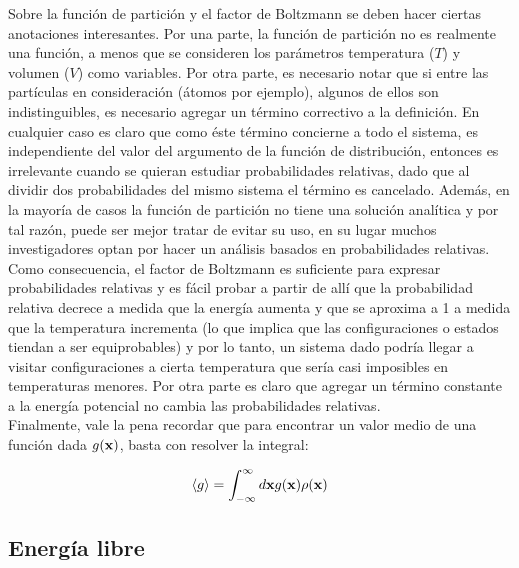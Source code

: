 \documentclass [11pt]{article}
\begin{document}
Sobre la función de partición y el factor de Boltzmann se deben hacer ciertas anotaciones interesantes. Por una parte, la función de partición no es realmente una función, a menos que se consideren los parámetros temperatura ($T$) y volumen ($V$) como variables. Por otra parte, es necesario notar que si entre las partículas en consideración (átomos por ejemplo), algunos de ellos son indistinguibles, es necesario agregar un término correctivo a la definición. En cualquier caso es claro que como éste término concierne a todo el sistema, es independiente del valor del argumento de la función de distribución, entonces es irrelevante cuando se quieran estudiar probabilidades relativas, dado que al dividir dos probabilidades del mismo sistema el término es cancelado. Además, en la mayoría de casos la función de partición no tiene una solución analítica y por tal razón, puede ser mejor tratar de evitar su uso, en su lugar muchos investigadores optan por hacer un análisis basados en probabilidades relativas. Como consecuencia, el factor de Boltzmann es suficiente para expresar probabilidades relativas y es fácil probar a partir de allí que la probabilidad relativa decrece a medida que la energía aumenta y que se aproxima a 1 a medida que la temperatura incrementa (lo que implica que las configuraciones o estados tiendan a ser equiprobables) y por lo tanto, un sistema dado podría llegar a visitar configuraciones a cierta temperatura que sería casi imposibles en temperaturas menores. Por otra parte es claro que agregar un término constante a la energía potencial no cambia las probabilidades relativas.\\

Finalmente, vale la pena recordar que para encontrar un valor medio de una función dada $g({\bf x})$, basta con resolver la integral:

\begin{equation}
    \langle g\rangle=\int_{-\infty}^{\infty} d{\bf x} g({\bf x}) \rho({\bf x})
\end{equation}

\subsection{Energía libre}
\end{document}

